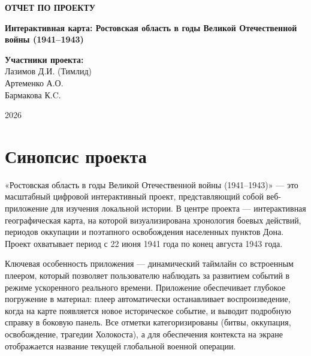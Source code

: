 \documentclass[a4paper,12pt]{article}
\begin{document}
\begin{titlepage}
    \begin{center}
        \vspace*{5cm}
        
        \textbf{\Large ОТЧЕТ ПО ПРОЕКТУ}
        
        \vspace{2cm}
        
        {\Large \textbf{Интерактивная карта: Ростовская область в годы Великой Отечественной войны (1941--1943)}}
        
        \vspace{4cm}
        
        \begin{flushright}
            \textbf{Участники проекта:}\\
            Лазимов Д.И. (Тимлид) \\
            Артеменко А.О. \\
            Бармакова К.C. \\ 
        \end{flushright}
        
        \vfill
        
        {\large 2026} 
    \end{center}
\end{titlepage}

\newpage

\section*{Синопсис проекта}
«Ростовская область в годы Великой Отечественной войны (1941--1943)» — это масштабный цифровой интерактивный проект, представляющий собой веб-приложение для изучения локальной истории. В центре проекта — интерактивная географическая карта, на которой визуализирована хронология боевых действий, периодов оккупации и поэтапного освобождения населенных пунктов Дона. Проект охватывает период с 22 июня 1941 года по конец августа 1943 года. 

Ключевая особенность приложения — динамический таймлайн со встроенным плеером, который позволяет пользователю наблюдать за развитием событий в режиме ускоренного реального времени. Приложение обеспечивает глубокое погружение в материал: плеер автоматически останавливает воспроизведение, когда на карте появляется новое историческое событие, и выводит подробную справку в боковую панель. Все отметки категоризированы (битвы, оккупация, освобождение, трагедии Холокоста), а для обеспечения контекста на экране отображается название текущей глобальной военной операции.
\end{document}
